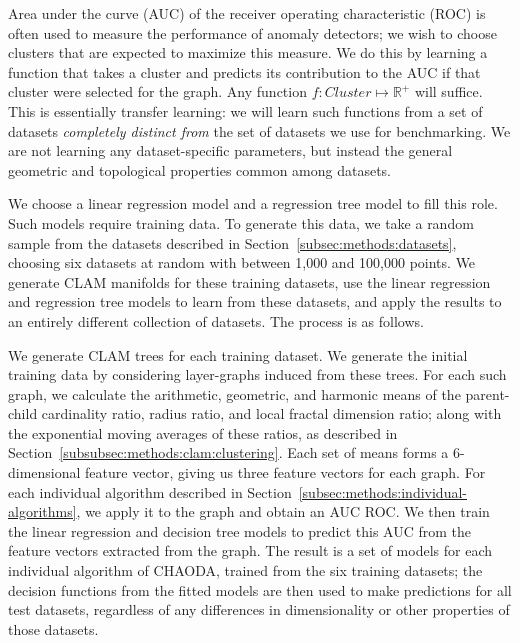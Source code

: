 Area under the curve (AUC) of the receiver operating characteristic (ROC) is often used to measure the performance of anomaly detectors;
we wish to choose clusters that are expected to maximize this measure.
We do this by learning a function that takes a cluster and predicts its contribution to the AUC if that cluster were selected for the graph.
Any function $f: Cluster \mapsto \mathbb{R}^+$ will suffice.
This is essentially transfer learning: we will learn such functions from a set of datasets \emph{completely distinct from} the set of datasets we use for benchmarking.
We are not learning any dataset-specific parameters, but instead the general geometric and topological properties common among datasets.

We choose a linear regression model and a regression tree model to fill this role.
Such models require training data.
To generate this data, we take a random sample from the datasets described in Section~\ref{subsec:methods:datasets}, choosing six datasets at random with between 1,000 and 100,000 points.
We generate CLAM manifolds for these training datasets, use the linear regression and regression tree models to learn from these datasets, and apply the results to an entirely different collection of datasets.
The process is as follows.

We generate CLAM trees for each training dataset.
We generate the initial training data by considering layer-graphs induced from these trees.
For each such graph, we calculate the arithmetic, geometric, and harmonic means of the parent-child cardinality ratio, radius ratio, and local fractal dimension ratio;
along with the exponential moving averages of these ratios, as described in Section~\ref{subsubsec:methods:clam:clustering}.
Each set of means forms a 6-dimensional feature vector, giving us three feature vectors for each graph.
For each individual algorithm described in Section~\ref{subsec:methods:individual-algorithms}, we apply it to the graph and obtain an AUC ROC\@.
We then train the linear regression and decision tree models to predict this AUC from the feature vectors extracted from the graph.
The result is a set of models for each individual algorithm of CHAODA, trained from the six training datasets;
the decision functions from the fitted models are then used to make predictions for all test datasets, regardless of any differences in dimensionality or other properties of those datasets.

